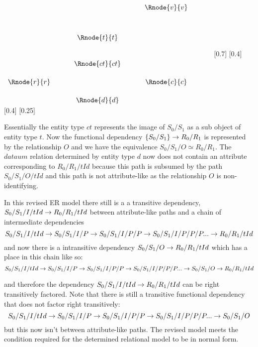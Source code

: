 $
\begin{array}{cp{0.5cm}cp{0.5cm}cp{0.3cm}c}
            &&                && \Rnode{v}{v} &&              \\[1.1cm]
            && \Rnode{t}{t}   &&              &&              \\[0.9cm] 
						&& \Rnode{ct}{ct} &&              &&              \\[0.5cm] 
\Rnode{r}{r}&&                && \Rnode{c}{c} &&              \\[0.5cm]
	          && \Rnode{d}{d}   &&              &&               
\end{array}
$
[0.7]
[0.4]
\idcomp
{}
[0.4]
\idcomp
{} 
\idcomp
{} 
\idcomp
{}
\idcomp
{}
\idcomp
{}
\idcomp
[0.25]
\idcomp

Essentially the entity type $ct$ represents the image of $S_0/S_1$
as a sub object of entity type $t$. Now the functional dependency
$\left\{S_0/S_1\right\} \rightarrow R_0/{R_1}$ is represented by the relationship $O$
and we have the equivalence $S_0/S_1/O \simeq R_0/R_1$. The $dataum$
relation determined by entity type $d$ now does not contain an attribute
corresponding to $R_0/R_1/tId$ because this path is subsumed by the path
$S_0/S_1/O/tId$ and this path is not attribute-like
as the relationship $O$ is non-identifying. 

In this revised ER model there still is a 
a transitive dependency, $S_0/S_1/I/tId \rightarrow R_0/R_1/tId$ between attribute-like paths 
and a chain of intermediate dependencies 
\begin{equation}
S_0/S_1/I/tId \rightarrow S_0/S_1/I/P \rightarrow S_0/S_1/I/P/P \rightarrow S_0/S_1/I/P/P/P  ... \rightarrow R_0/R_1/tId
\end{equation}
and now there is a intransitive dependency $S_0/S_1/O \rightarrow R_0/R_1/tId$ which has a place in this chain like so:
\begin{equation}
S_0/S_1/I/tId \rightarrow S_0/S_1/I/P \rightarrow S_0/S_1/I/P/P \rightarrow S_0/S_1/I/P/P/P  ... \rightarrow S_0/S_1/O \rightarrow R_0/R_1/tId
\end{equation}

and therefore the dependency $S_0/S_1/I/tId \rightarrow R_0/R_1/tId$ can be right transitively factored.
Note that there is still a transitive functional dependency that does not factor right transitively:
\begin{equation}
S_0/S_1/I/tId \rightarrow S_0/S_1/I/P \rightarrow S_0/S_1/I/P/P \rightarrow S_0/S_1/I/P/P/P  ... \rightarrow S_0/S_1/O
\end{equation}
 but this now isn't between attribute-like paths. The revised model meets the condition required for the determined relational model to be in normal form.


